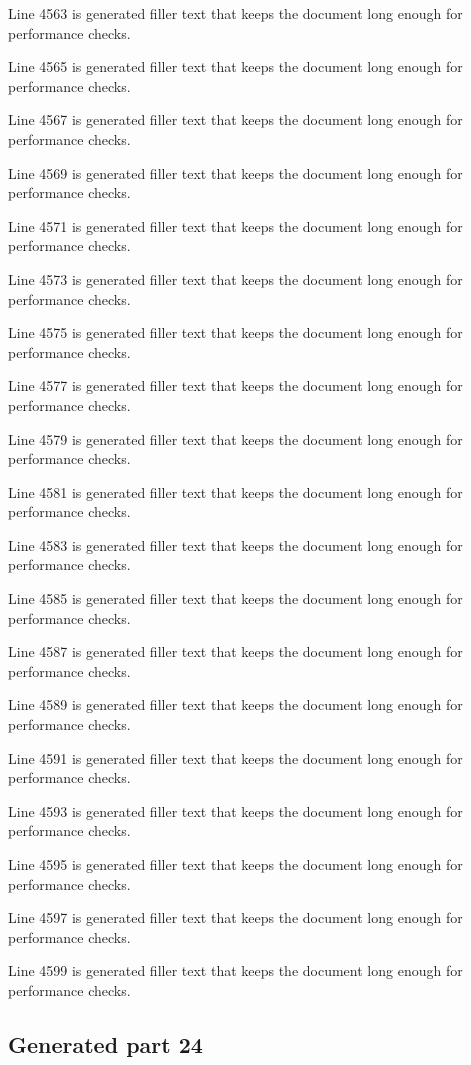 Line 4563 is generated filler text that keeps the document long enough for performance checks.

Line 4565 is generated filler text that keeps the document long enough for performance checks.

Line 4567 is generated filler text that keeps the document long enough for performance checks.

Line 4569 is generated filler text that keeps the document long enough for performance checks.

Line 4571 is generated filler text that keeps the document long enough for performance checks.

Line 4573 is generated filler text that keeps the document long enough for performance checks.

Line 4575 is generated filler text that keeps the document long enough for performance checks.

Line 4577 is generated filler text that keeps the document long enough for performance checks.

Line 4579 is generated filler text that keeps the document long enough for performance checks.

Line 4581 is generated filler text that keeps the document long enough for performance checks.

Line 4583 is generated filler text that keeps the document long enough for performance checks.

Line 4585 is generated filler text that keeps the document long enough for performance checks.

Line 4587 is generated filler text that keeps the document long enough for performance checks.

Line 4589 is generated filler text that keeps the document long enough for performance checks.

Line 4591 is generated filler text that keeps the document long enough for performance checks.

Line 4593 is generated filler text that keeps the document long enough for performance checks.

Line 4595 is generated filler text that keeps the document long enough for performance checks.

Line 4597 is generated filler text that keeps the document long enough for performance checks.

Line 4599 is generated filler text that keeps the document long enough for performance checks.

\subsection{Generated part 24}

